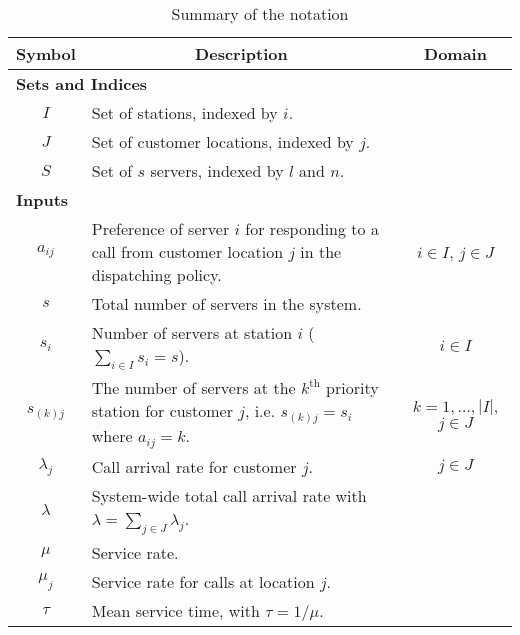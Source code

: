 \documentclass[11pt]{article}\topmargin 0mm
\begin{document}
\sspace
\begin{table}
\footnotesize \centering \caption{Summary of the
notation\label{tbl:symbols2}} {\begin{tabular}{c p{3.8in} c}
\hline
Symbol & \multicolumn{1}{c}{Description} & Domain \\
\hline
\multicolumn{3}{l}{\color{blue}\textbf{Sets and Indices} } \\
\color{blue}$I$ & \color{blue}Set of stations, indexed by $i$. & \\
\color{blue}$J$ & \color{blue}Set of customer locations, indexed by $j$. & \\
\color{blue}$S$ & \color{blue}Set of $s$ servers, indexed by $l$ and $n$. & \\
\multicolumn{3}{l}{\textbf{Inputs} } \\
$a_{ij}$ & Preference of server $i$ for responding to a call from customer location $j$ in the dispatching policy. & $i\in I$, $j\in J$ \\
$s$ & Total number of servers in the system. & \\
$s_i$ & Number of servers at station $i$ ($\sum_{i\in I}s_i=s$). & $i\in I$ \\
$s_{(k)j}$ & The number of servers at the $k^\text{th}$ priority station for customer $j$, i.e. $s_{(k)j}=s_i$ where $a_{ij}=k$. & $k=1,...,|I|$, $j\in J$ \\
$\lambda_j$ & Call arrival rate for customer $j$. & $j\in J$ \\
$\lambda$ & System-wide total call arrival rate with $\lambda = \sum_{j \in J} \lambda_j$. & \\
$\mu$ & Service rate. & \\
$\mu_j$ & Service rate for calls at location $j$. & \\
$\tau$ & Mean service time, with $\tau=1/\mu$. & \\

\end{tabular}}
\end{table}
\end{document}

